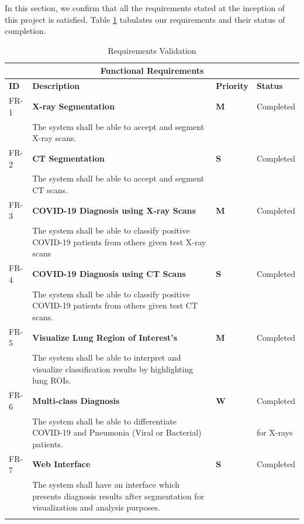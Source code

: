In this section, we confirm that all the requirements stated at the inception of this project is satisfied. Table \ref{tab:Requirements Validation} tabulates our requirements and their status of completion.
\vspace{1em}
\begin{longtable}{| p{} | p{} | p{} | p{} |} 
\hline
\multicolumn{4}{|c|}{\textbf{Functional Requirements}}\\
\hline
\textbf{ID} & \textbf{Description} & \textbf{Priority} & \textbf{Status}  \\
\hline
FR-1 & \textbf{X-ray Segmentation}  & \cellcolor{green}\textbf{M} & Completed \\ &  The system shall be able to accept and segment X-ray scans. & \cellcolor{green} &  \\ \hline 
FR-2 & \textbf{CT Segmentation}  & \cellcolor{cyan}\textbf{S} & Completed\\ &  The system shall be able to accept and segment CT scans. & \cellcolor{cyan} &  \\ \hline 
FR-3 & \textbf{COVID-19 Diagnosis using X-ray Scans}  & \cellcolor{green}\textbf{M} & Completed\\ & The system shall be able to classify positive COVID-19 patients from others given test X-ray scans & \cellcolor{green} & \\ \hline 
FR-4 & \textbf{COVID-19 Diagnosis using CT Scans}  & \cellcolor{cyan}\textbf{S} & Completed\\ &  The system shall be able to classify positive COVID-19 patients from others given test CT scans. & \cellcolor{cyan} & \\ \hline
FR-5 & \textbf{Visualize Lung Region of Interest's}  & \cellcolor{green}\textbf{M} & Completed\\ &  The system shall be able to interpret and visualize classification results by highlighting lung ROIs. & \cellcolor{green} & \\ \hline 
FR-6 & \textbf{Multi-class Diagnosis}  & \cellcolor{pink}\textbf{W} & Completed\\ &  The system shall be able to differentiate COVID-19 and Pneumonia (Viral or Bacterial) patients. & \cellcolor{pink} & for X-rays \\ \hline 
FR-7 & \textbf{Web Interface}  & \cellcolor{cyan}\textbf{S} & Completed\\ &  The system shall have an interface which presents diagnosis results after segmentation for visualization and analysis purposes. & \cellcolor{cyan} & \\ \hline

\caption{Requirements Validation}

  \label{tab:Requirements Validation}
  \end{longtable}

